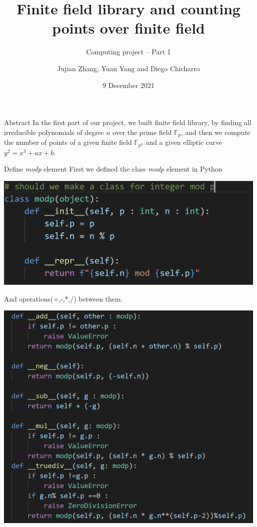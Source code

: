 \documentclass{beamer}
\title{\LARGE Finite field library and counting points over finite field}
\subtitle{Computing project -- Part 1}
\author{Jujian Zhang, Yuan Yang and Diego Chicharro}
\institute{LSGNT}
\date{9 December 2021}
\begin{document}
\begin{frame}
    \maketitle
\end{frame}

\begin{frame}{Abstract}
    In the first part of our project, we built finite field library, by finding all irreducible polynomials 
    of degree $n$ over the prime field $\mathbb{F}_{p}$, and then we
    compute the number of points of a given finite field $\mathbb{F}_{p^n}$ and a given elliptic curve
    $y^2=x^3+ax+b$. 
\end{frame}

\begin{frame}{Define \emph{modp} element}
    First we defined the class \emph{modp} element in Python
    \begin{center}
        \includegraphics[scale = .4]{modp.png}
    \end{center}
    And operations(+,-,*,/) between them.
    \begin{center}
        \includegraphics[scale = .4]{modpoperations.png}
    \end{center}
\end{frame}
\end{document}
